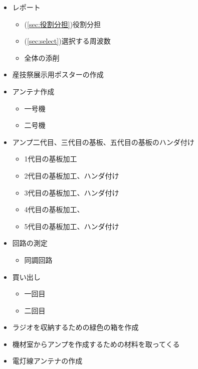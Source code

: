 \documentclass[report.tex]{subfiles}
\begin{document}
\begin{itemize}
	\item レポート
	      \begin{itemize}
		      \item (\ref{sec:役割分担})役割分担
		      \item (\ref{sec:select})選択する周波数
		      \item 全体の添削
	      \end{itemize}
	\item 産技祭展示用ポスターの作成
	\item アンテナ作成
	      \begin{itemize}
		      \item 一号機
		      \item 二号機
	      \end{itemize}
	\item アンプ二代目、三代目の基板、五代目の基板のハンダ付け
	      \begin{itemize}
		      \item 1代目の基板加工
		      \item 2代目の基板加工、ハンダ付け
		      \item 3代目の基板加工、ハンダ付け
		      \item 4代目の基板加工、
		      \item 5代目の基板加工、ハンダ付け
	      \end{itemize}
	\item 回路の測定
	      \begin{itemize}
		      \item 同調回路
	      \end{itemize}
	\item 買い出し
	      \begin{itemize}
		      \item 一回目
		      \item 二回目
	      \end{itemize}
	\item ラジオを収納するための緑色の箱を作成
	\item 機材室からアンプを作成するための材料を取ってくる
	\item 電灯線アンテナの作成
\end{itemize}
\end{document}
